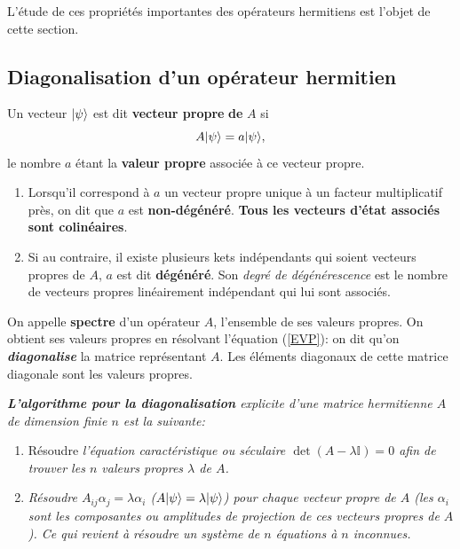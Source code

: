 L'étude de ces propriétés importantes des opérateurs hermitiens est l'objet de
cette section.

\subsection{Diagonalisation d'un opérateur hermitien}

Un vecteur $\vert\psi\rangle$ est dit \textbf{vecteur propre} \textbf{de} $A$ si
\begin{equation}
A\vert\psi\rangle=a\vert\psi\rangle,
\label{EVP}
\end{equation}
le nombre $a$ étant la \textbf{valeur propre} associée à ce vecteur propre.

\begin{enumerate}
\item Lorsqu'il correspond à $a$ un vecteur propre unique à un facteur
multiplicatif près, on dit que $a$ est \textbf{non-dégénéré}. \textbf{Tous les
vecteurs d'état associés sont colinéaires}.

\item Si au contraire, il existe plusieurs kets indépendants qui soient
vecteurs propres de $A$, $a$ est dit \textbf{dégénéré}. Son \emph{degré de
dégénérescence} est le nombre de vecteurs propres linéairement indépendant qui
lui sont associés.
\end{enumerate}

On appelle \textbf{spectre} d'un opérateur $A$, l'ensemble de ses valeurs
propres. On obtient ses valeurs propres en résolvant l'équation (\ref{EVP}): on
dit qu'on \textbf{\emph{diagonalise}} la matrice représentant $A$. Les éléments
diagonaux de cette matrice diagonale sont les valeurs propres.

\medskip
\colorbox[gray]{0.8}{
\parbox[c]{0.9\textwidth}{
\emph{\textbf{L'algorithme pour la diagonalisation} explicite d'une
matrice hermitienne $A$ de dimension finie $n$ est la suivante:}

\begin{enumerate}
\item Résoudre \emph{l'équation caractéristique ou séculaire $\det(A-\lambda
\mathbb{I})=0$ afin de trouver les $n$ valeurs propres $\lambda$ de $A$.}

\item \emph{Résoudre $A_{ij}\alpha_{j}=\lambda\alpha_{i}$ ($A\vert\psi\rangle
=\lambda\vert\psi\rangle$) pour chaque vecteur propre de $A$ (les $\alpha_{i}$ sont
les composantes ou amplitudes de projection de ces vecteurs propres de $A$). Ce
qui revient à résoudre un système de $n$ équations à $n$ inconnues.}
\end{enumerate}
}}
\medskip

